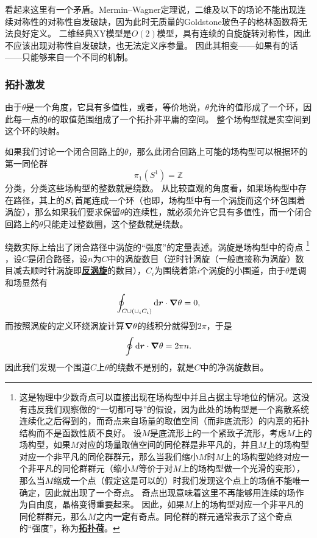 \documentclass[hyperref, UTF8, a4paper]{ctexart}
\renewcommand{\emph}[1]{\textbf{#1}}
\newcommand*{\concept}[1]{\underline{\textbf{#1}}}
\begin{document}
看起来这里有一个矛盾。Mermin–Wagner定理说，二维及以下的场论不能出现连续对称性的对称性自发破缺，因为此时无质量的Goldstone玻色子的格林函数将无法良好定义。
二维经典XY模型是$O(2)$模型，具有连续的自旋旋转对称性，因此不应该出现对称性自发破缺，也无法定义序参量。
因此其相变——如果有的话——只能够来自一个不同的机制。

\subsubsection{拓扑激发}

由于$\theta$是一个角度，它具有多值性，或者，等价地说，$\theta$允许的值形成了一个环，因此每一点的$\theta$的取值范围组成了一个拓扑非平庸的空间。
整个场构型就是实空间到这个环的映射。

如果我们讨论一个闭合回路上的$\theta$，那么此闭合回路上可能的场构型可以根据环的第一同伦群
\[
    \pi_1(S^1) = \mathbb{Z}
\]
分类，分类这些场构型的整数就是绕数。
从比较直观的角度看，如果场构型中存在路径，其上的$\vb*{S}_i$首尾连成一个环（也即，场构型中有一个涡旋而这个环包围着涡旋），那么如果我们要求保留$\theta$的连续性，就必须允许它具有多值性，而一个闭合回路上的$\theta$只能走过整数圈，这个整数就是绕数。

绕数实际上给出了闭合路径中涡旋的“强度”的定量表述。涡旋是场构型中的奇点%
\footnote{
    这是物理中少数奇点可以直接出现在场构型中并且占据主导地位的情况。这没有违反我们观察做的“一切都可导”的假设，因为此处的场构型是一个离散系统连续化之后得到的，而奇点来自场量的取值空间（而非底流形）的内禀的拓扑结构而不是函数性质不良好。
    设$M$是底流形上的一个紧致子流形，考虑$M$上的场构型，如果$M$对应的场量取值空间的同伦群是非平凡的，并且$M$上的场构型对应一个非平凡的同伦群群元，那么当我们缩小$M$时$M$上的场构型始终对应一个非平凡的同伦群群元（缩小$M$等价于对$M$上的场构型做一个光滑的变形），那么当$M$缩成一个点（假定这是可以的）时我们发现这个点上的场值不能唯一确定，因此就出现了一个奇点。
    奇点出现意味着这里不再能够用连续的场作为自由度，晶格变得重要起来。
    因此，如果$M$上的场构型对应一个非平凡的同伦群群元，那么$M$之内\emph{一定}有奇点。同伦群的群元通常表示了这个奇点的“强度”，称为\concept{拓扑荷}。
}%
，设$C$是闭合路径，设$n$为$C$中的涡旋数目（逆时针涡旋（一般直接称为涡旋）数目减去顺时针涡旋即\concept{反涡旋}的数目），$C_i$为围绕着第$i$个涡旋的小围道，由于$\theta$是调和场显然有
\[
    \oint_{C \cup ( \cup_i C_i)} \dd{\vb*{r}} \cdot \grad{\theta} = 0,
\]
而按照涡旋的定义环绕涡旋计算$\grad{\theta}$的线积分就得到$2\pi$，于是
\begin{equation}
    \oint \dd{\vb*{r}} \cdot \grad{\theta} = 2 \pi n.
\end{equation}
因此我们发现一个围道$C$上$\theta$的绕数不是别的，就是$C$中的净涡旋数目。
\end{document}
